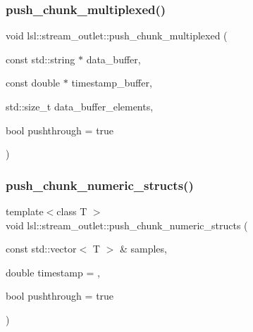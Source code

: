 \mbox{\label{classlsl_1_1stream__outlet_a17744ee6e963464fe6442d1e6f1a50f8}} 
\subsubsection{\texorpdfstring{push\+\_\+chunk\+\_\+multiplexed()}{push\_chunk\_multiplexed()}\hspace{0.1cm}{\footnotesize\ttfamily [28/28]}}
{\footnotesize\ttfamily void lsl\+::stream\+\_\+outlet\+::push\+\_\+chunk\+\_\+multiplexed (\begin{DoxyParamCaption}\item[{const std\+::string $\ast$}]{data\+\_\+buffer,  }\item[{const double $\ast$}]{timestamp\+\_\+buffer,  }\item[{std\+::size\+\_\+t}]{data\+\_\+buffer\+\_\+elements,  }\item[{bool}]{pushthrough = {\ttfamily true} }\end{DoxyParamCaption})\hspace{0.3cm}{\ttfamily [inline]}}

\mbox{\label{classlsl_1_1stream__outlet_ad7e1405b50bc546c4f742f508aa734cc}} 
\subsubsection{\texorpdfstring{push\+\_\+chunk\+\_\+numeric\+\_\+structs()}{push\_chunk\_numeric\_structs()}\hspace{0.1cm}{\footnotesize\ttfamily [1/2]}}
{\footnotesize\ttfamily template$<$class T $>$ \\
void lsl\+::stream\+\_\+outlet\+::push\+\_\+chunk\+\_\+numeric\+\_\+structs (\begin{DoxyParamCaption}\item[{const std\+::vector$<$ T $>$ \&}]{samples,  }\item[{double}]{timestamp = {},  }\item[{bool}]{pushthrough = {\ttfamily true} }\end{DoxyParamCaption})\hspace{0.3cm}{\ttfamily [inline]}}

